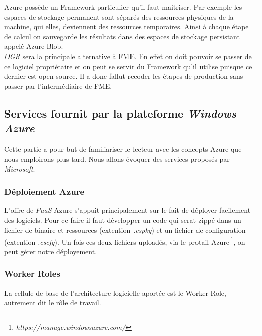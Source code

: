 Azure possède un Framework particulier qu'il faut maitriser. Par
exemple les espaces de stockage permanent sont séparés des ressources
physiques de la machine, qui elles, deviennent des ressources
temporaires. Ainsi à chaque étape de calcul on sauvegarde les
résultats dans des espaces de stockage persistant appelé Azure Blob.\\

 \textit{OGR} sera la principale alternative à FME. En effet on doit
 pouvoir se passer de ce logiciel propriétaire et on peut se servir du
 Framework qu'il utilise puisque ce dernier est open source. Il a donc
 fallut recoder les étapes de production sans passer par
 l'intermédiaire de FME.\\






%
%



\subsection{Services fournit par la plateforme \textit{Windows Azure}}
Cette partie a pour but de familiariser le lecteur avec les concepts
Azure que nous emploirons plus tard. Nous allons évoquer des services
proposés par \textit{Microsoft}.\\


\subsubsection{Déploiement Azure}
L'offre de \textit{PaaS} Azure s'appuit principalement sur le fait de
déployer facilement des logiciels. Pour ce faire il faut développer un
code qui serat zippé dans un fichier de binaire et ressources
(extention \textit{.cspkg}) et un fichier de configuration (extention
\textit{.cscfg}). Un fois ces deux fichiers uploadés, via le protail
Azure\,\footnote{\textit{https://manage.windowsazure.com/}}, on peut
gérer notre déployement. \\

\subsubsection{Worker Roles}
La cellule de base de l'architecture logicielle aportée est le Worker
Role, autrement dit le rôle de travail. \\

